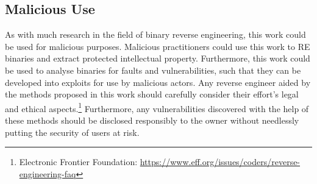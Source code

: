 \subsection{Malicious Use}
As with much research in the field of binary reverse engineering, this work could be used for malicious purposes. Malicious practitioners could use this work to RE binaries and extract protected intellectual property. Furthermore, this work could be used to analyse binaries for faults and vulnerabilities, such that they can be developed into exploits for use by malicious actors. Any reverse engineer aided by the methods proposed in this work should carefully consider their effort's legal and ethical aspects.\footnote{Electronic Frontier Foundation: \url{https://www.eff.org/issues/coders/reverse-engineering-faq}} Furthermore, any vulnerabilities discovered with the help of these methods should be disclosed responsibly to the owner without needlessly putting the security of users at risk. 